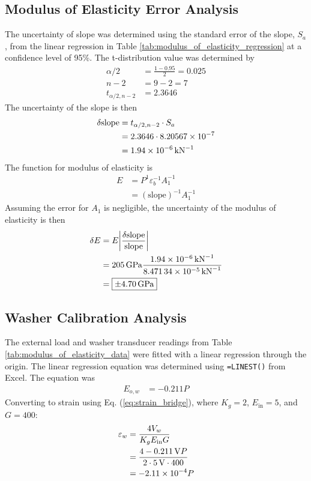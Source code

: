 \subsection{Modulus of Elasticity Error Analysis}
The uncertainty of slope was determined using the standard error of the slope, $S_a$, from the linear regression in Table \ref{tab:modulus_of_elasticity_regression} at a confidence level of 95\%. The t-distribution value was determined by 
\begin{align*}
    \alpha/2 &= \frac{1 - 0.95}{2} = 0.025 \\
    n - 2 &= 9 - 2 = 7 \\
    t_{\alpha/2, n-2} &= 2.3646
\end{align*}
The uncertainty of the slope is then \cite{wheeler_ganji}
\begin{align*}
    \delta \text{slope} &= t_{\alpha/2, n-2} \cdot S_a \\
    &= 2.3646 \cdot 8.20567 \times 10^{-7} \\
    &= \qty{1.94E-06}{\per\kilo\newton}
\end{align*}
The function for modulus of elasticity is 
\begin{align*}
    E &= P^{1} \varepsilon_b^{-1} A_1^{-1} \\
    &= (\text{slope})^{-1} A_1^{-1}
\end{align*}
Assuming the error for $A_1$ is negligible, the uncertainty of the modulus of elasticity is then
\begin{align*}
    \delta E &= E \bigg|\frac{\delta \text{slope}}{\text{slope}}\bigg|\\
    &= \qty{205}{\giga\pascal} \frac{\qty{1.94E-06}{\per\kilo\newton}}{\qty{8.47134E-05}{\per\kilo\newton}} \\
    &= \boxed{\pm \qty{4.70}{\giga\pascal}}
\end{align*}

\subsection{Washer Calibration Analysis}
The external load and washer transducer readings from Table \ref{tab:modulus_of_elasticity_data} were fitted with a linear regression through the origin. The linear regression equation was determined using \texttt{=LINEST()} from Excel. The equation was 
\begin{align*}
    E_{o, w} &= -0.211 P 
\end{align*}
Converting to strain using Eq. (\ref{eq:strain_bridge}), where $K_g = 2$, $E_{\text{in}} = 5$, and $G = 400$:
\begin{align*}
    \varepsilon_w &= \frac{4 V_{w}}{K_g E_{\text{in}} G} \\
    &= \frac{4 \qty{-0.211}{V}P}{2 \cdot \qty{5}{V} \cdot 400} \\
    &= \qty{-2.11E-04}{} P
\end{align*}


